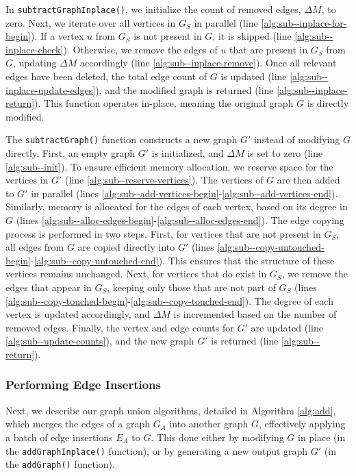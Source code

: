 In \texttt{subtractGraphInplace()}, we initialize the count of removed edges, $\Delta M$, to zero. Next, we iterate over all vertices in $G_S$ in parallel (line \ref{alg:sub--inplace-for-begin}). If a vertex $u$ from $G_S$ is not present in $G$, it is skipped (line \ref{alg:sub--inplace-check}). Otherwise, we remove the edges of $u$ that are present in $G_S$ from $G$, updating $\Delta M$ accordingly (line \ref{alg:sub--inplace-remove}). Once all relevant edges have been deleted, the total edge count of $G$ is updated (line \ref{alg:sub--inplace-update-edges}), and the modified graph is returned (line \ref{alg:sub--inplace-return}). This function operates in-place, meaning the original graph $G$ is directly modified.

The \texttt{subtractGraph()} function constructs a new graph $G'$ instead of modifying $G$ directly. First, an empty graph $G'$ is initialized, and $\Delta M$ is set to zero (line \ref{alg:sub--init}). To ensure efficient memory allocation, we reserve space for the vertices in $G'$ (line \ref{alg:sub--reserve-vertices}). The vertices of $G$ are then added to $G'$ in parallel (lines \ref{alg:sub--add-vertices-begin}-\ref{alg:sub--add-vertices-end}). Similarly, memory is allocated for the edges of each vertex, based on its degree in $G$ (lines \ref{alg:sub--alloc-edges-begin}-\ref{alg:sub--alloc-edges-end}). The edge copying process is performed in two steps. First, for vertices that are not present in $G_S$, all edges from $G$ are copied directly into $G'$ (lines \ref{alg:sub--copy-untouched-begin}-\ref{alg:sub--copy-untouched-end}). This ensures that the structure of these vertices remains unchanged. Next, for vertices that do exist in $G_S$, we remove the edges that appear in $G_S$, keeping only those that are not part of $G_S$ (lines \ref{alg:sub--copy-touched-begin}-\ref{alg:sub--copy-touched-end}). The degree of each vertex is updated accordingly, and $\Delta M$ is incremented based on the number of removed edges. Finally, the vertex and edge counts for $G'$ are updated (line \ref{alg:sub--update-counts}), and the new graph $G'$ is returned (line \ref{alg:sub--return}).




\subsubsection{Performing Edge Insertions}
\label{sec:add}

Next, we describe our graph union algorithms, detailed in Algorithm \ref{alg:add}, which merges the edges of a graph $G_A$ into another graph $G$, effectively applying a batch of edge insertions $E_A$ to $G$. This done either by modifying $G$ in place (in the \texttt{addGraphInplace()} function), or by generating a new output graph $G'$ (in the \texttt{addGraph()} function).


